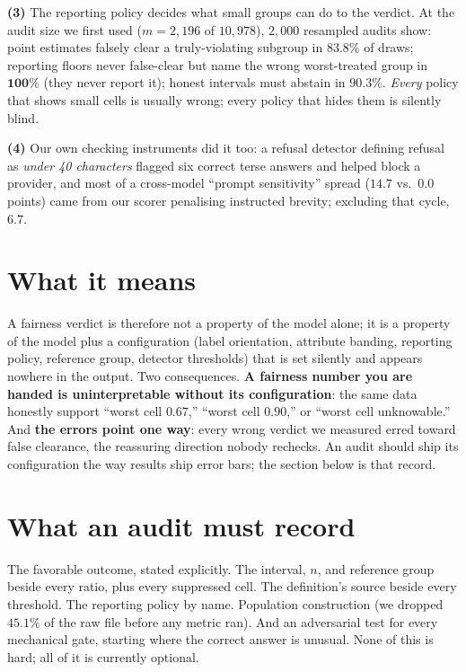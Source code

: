 \documentclass[sigconf,nonacm]{acmart}
\begin{document}
\textbf{(3)} The reporting policy decides what small groups can do to the
verdict. At the audit size we first used ($m{=}2{,}196$ of $10{,}978$),
$2{,}000$ resampled audits show: point estimates falsely clear a
truly-violating subgroup in $\mathbf{83.8\%}$ of draws; reporting floors never
false-clear but name the wrong worst-treated group in $\mathbf{100\%}$
(they never report it); honest intervals must abstain in $90.3\%$.
\emph{Every} policy that shows small cells is usually wrong; every policy
that hides them is silently blind.

\textbf{(4)} Our own checking instruments did it too: a refusal detector
defining refusal as \emph{under 40 characters} flagged six correct terse
answers and helped block a provider, and most of a cross-model ``prompt
sensitivity'' spread ($14.7$ vs.\ $0.0$ points) came from our scorer
penalising instructed brevity; excluding that cycle, $6.7$.

\section{What it means}

A fairness verdict is therefore not a property of the model alone; it is a
property of the model plus a configuration (label orientation, attribute
banding, reporting policy, reference group, detector thresholds) that is set
silently and appears nowhere in the output. Two consequences. \textbf{A
fairness number you are handed is uninterpretable without its configuration}:
the same data honestly support ``worst cell $0.67$,'' ``worst cell $0.90$,''
or ``worst cell unknowable.'' And \textbf{the errors point one way}: every
wrong verdict we measured erred toward false clearance, the reassuring
direction nobody rechecks. An audit should ship its configuration the way
results ship error bars; the section below is that record.

\section{What an audit must record}

The favorable outcome, stated explicitly. The interval, $n$, and reference
group beside every ratio, plus every suppressed cell. The definition's source
beside every threshold. The reporting policy by name. Population construction
(we dropped $45.1\%$ of the raw file before any metric ran). And an
adversarial test for every mechanical gate, starting where the correct answer
is unusual. None of this is hard; all of it is currently optional.
\end{document}
